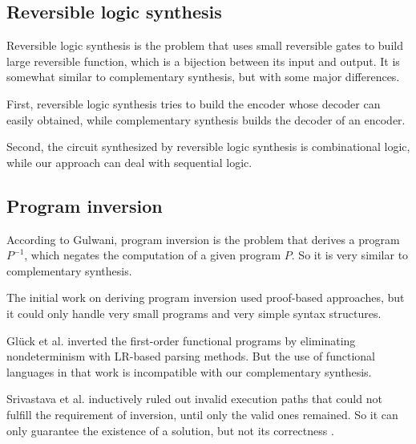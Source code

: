 \documentclass[journal]{IEEEtran}
\begin{document}
\subsection{Reversible logic synthesis}\label{subsec_revsyn}
Reversible logic synthesis \cite{YexinZheng_aspdac09,RobertWille_dac10,VivekVShende_tcad03,WilliamHung_dac04,Kerntopf_dac04,
Maslov_tcad05,Gupta_tcad06,Maslov_tcad11} is the problem that uses small reversible gates to build large reversible function,
which is a bijection between its input and output.
It is somewhat similar to complementary synthesis,
but with some major differences.

First,
reversible logic synthesis tries to build the encoder whose decoder can easily obtained,
while complementary synthesis builds the decoder of an encoder.

Second,
the circuit synthesized by reversible logic synthesis is combinational logic,
while our approach can deal with sequential logic.



\subsection{Program inversion}\label{subsec_proinv}
According to Gulwani\cite{dim_syn},
program inversion is the problem that derives a program $P^{-1}$,
which negates the computation of a given program $P$.
So it is very similar to complementary synthesis.

The initial work on deriving program inversion used proof-based approaches\cite{prog_inv},
but it could only handle very small programs and very simple syntax structures.

Gl\"{u}ck et al. \cite{mtd_autoProginv} inverted the first-order functional programs
by eliminating nondeterminism with LR-based parsing methods.
But the use of functional languages in that work is incompatible with our complementary synthesis.

Srivastava et al. \cite{prog_inv_rev}
inductively ruled out invalid execution paths that could not fulfill the requirement of inversion,
until only the valid ones remained.
So it can only guarantee the existence of a solution,
but not its correctness
.
\end{document}
